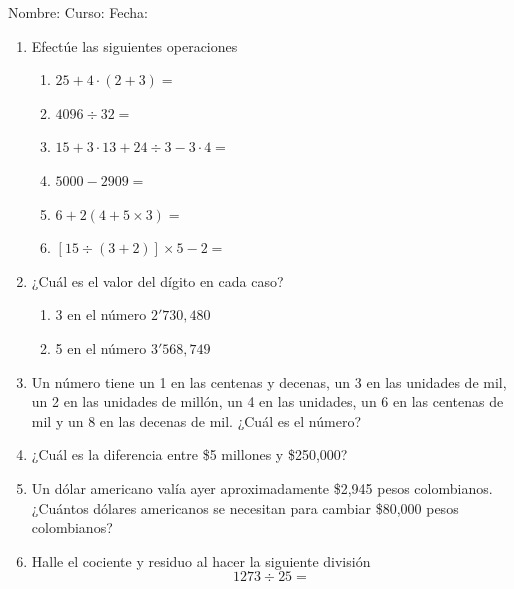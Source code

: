 \documentclass[letterpaper,fleqn]{article}
\newcommand{\LineaNombre}{%
\par
\vspace{\baselineskip}
Nombre:\hrulefill \; Curso: \underline{\hspace*{48pt}} \; Fecha: \underline{\hspace*{2.5cm}} \relax
\par}
\begin{document}
\LineaNombre
\begin{enumerate}
\item Efectúe las siguientes operaciones
\begin{enumerate}
\item $25+4\cdot (2+3)=$\noanswer
\item $4096\div 32=$ \noanswer
\item $15+3\cdot 13+24\div 3-3\cdot 4=$ \noanswer
\item $5000-2909=$\noanswer
\item $6+2(4+5\times 3)=$\noanswer
\item $[15\div (3+2)]\times 5-2=$\noanswer
\end{enumerate}
 \item ¿Cuál es el valor del dígito en cada caso?
 \begin{enumerate}
 \item 3 en el número $2'730,480$ \noanswer
 \item 5 en el número $3'568,749$ \noanswer
 \end{enumerate}
 \newpage
 \item Un número tiene un 1 en las centenas y decenas, un 3 en las unidades de mil, un 2 en las unidades de millón, un 4 en las unidades, un 6 en las centenas de mil y un 8 en las decenas de mil. ¿Cuál es el número?\noanswer
 \item ¿Cuál es la diferencia entre \$5 millones y \$250,000? \noanswer
 \item Un dólar americano valía ayer aproximadamente \$2,945 pesos colombianos. ¿Cuántos dólares americanos se necesitan para cambiar \$80,000 pesos colombianos?\noanswer
 \item Halle el cociente y residuo al hacer la siguiente división
 \[1273\div 25=\]\noanswer
 \end{enumerate}
\end{document}
